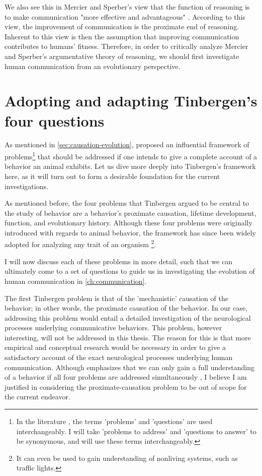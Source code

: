 We also see this in Mercier and Sperber's view that the function of reasoning is to make communication "more effective and advantageous" \citep[p.~60]{MS11}.
According to this view, the improvement of communication is the proximate end of reasoning. Inherent to this view is then the assumption that improving communication contributes to humans' fitness.
Therefore, in order to critically analyze Mercier and Sperber's argumentative theory of reasoning, we should first investigate human communication from an evolutionary perspective.

\section{Adopting and adapting Tinbergen's four questions}
\label{sec:tinbergen}
As mentioned in \cref{sec:causation-evolution}, \citet{Tinbergen63} proposed an influential framework of problems\footnote{In the literature \citep[e.g.][]{BatesonLaland13}, the terms 'problems' and 'questions' are used interchangeably. I will take 'problems to address' and 'questions to answer' to be synonymous, and will use these terms interchangeably.} that should be addressed if one intends to give a complete account of a behavior an animal exhibits. Let us dive more deeply into Tinbergen's framework here, as it will turn out to form a desirable foundation for the current investigations.

As mentioned before, the four problems that Tinbergen argued to be central to the study of behavior are a behavior's proximate causation, lifetime development, function, and evolutionary history.
Although these four problems were originally introduced with regards to animal behavior, the framework has since been widely adopted for analyzing any trait of an organism \citep{BatesonLaland13}\footnote{It can even be used to gain understanding of nonliving systems, such as traffic lights.}.

I will now discuss each of these problems in more detail, such that we can ultimately come to a set of questions to guide us in investigating the evolution of human communication in \cref{ch:communication}.

The first Tinbergen problem is that of the 'mechanistic' causation of the behavior; in other words, the proximate causation of the behavior. In our case, addressing this problem would entail a detailed investigation of the neurological processes underlying communicative behaviors.
This problem, however interesting, will not be addressed in this thesis. The reason for this is that more empirical and conceptual research would be necessary in order to give a satisfactory account of the exact neurological processes underlying human communication. Although \citet{Tinbergen63} emphasizes that we can only gain a full understanding of a behavior if all four problems are addressed simultaneously \citep[see also][]{BatesonLaland13}, I believe I am justified in considering the proximate-causation problem to be out of scope for the current endeavor.

